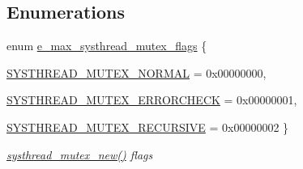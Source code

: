 \subsection*{Enumerations}
\begin{DoxyCompactItemize}
\item 
enum \hyperlink{group__threading_gaa95d9c538a1b25404d19106739db9802}{e\_\-max\_\-systhread\_\-mutex\_\-flags} \{ \par
\hyperlink{group__threading_ggaa95d9c538a1b25404d19106739db9802ae34f8741b28ee92a4d702bee8671bb32}{SYSTHREAD\_\-MUTEX\_\-NORMAL} =  0x00000000, 
\par
\hyperlink{group__threading_ggaa95d9c538a1b25404d19106739db9802abb3854e7bf495808b4251d1319cdfa45}{SYSTHREAD\_\-MUTEX\_\-ERRORCHECK} =  0x00000001, 
\par
\hyperlink{group__threading_ggaa95d9c538a1b25404d19106739db9802a4fa486d028b3153aac389ed24e63dddb}{SYSTHREAD\_\-MUTEX\_\-RECURSIVE} =  0x00000002
 \}
\begin{DoxyCompactList}\small\item\em \hyperlink{group__mutex_gaa8cae78764c59883566ac4f861dd534e}{systhread\_\-mutex\_\-new()} flags \item\end{DoxyCompactList}\end{DoxyCompactItemize}
